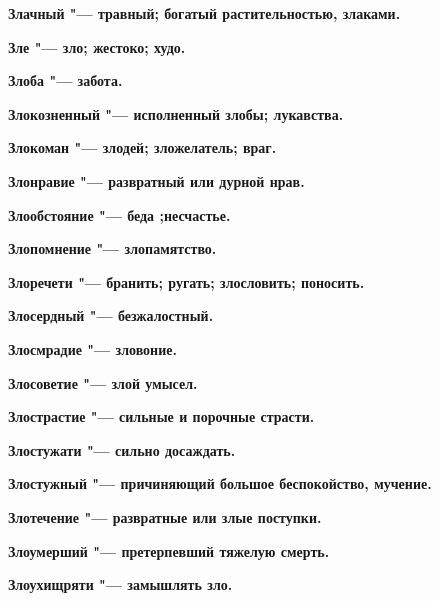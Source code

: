 \begin{mymulticols}{2}
\bfseries Злачный\normalfont{} "--- травный; богатый растительностью, злаками. 




\bfseries Зле\normalfont{} "--- зло; жестоко; худо. 




\bfseries Злоба\normalfont{} "--- забота. 




\bfseries Злокозненный\normalfont{} "--- исполненный злобы; лукавства. 




\bfseries Злокоман\normalfont{} "--- злодей; зложелатель; враг. 




\bfseries Злонравие\normalfont{} "--- развратный или дурной нрав. 




\bfseries Злообстояние\normalfont{} "--- беда ;несчастье. 




\bfseries Злопомнение\normalfont{} "--- злопамятство. 




\bfseries Злоречети\normalfont{} "--- бранить; ругать; злословить; поносить. 




\bfseries Злосердный\normalfont{} "--- безжалостный. 




\bfseries Злосмрадие\normalfont{} "--- зловоние. 




\bfseries Злосоветие\normalfont{} "--- злой умысел. 




\bfseries Злострастие\normalfont{} "--- сильные и порочные страсти. 




\bfseries Злостужати\normalfont{} "--- сильно досаждать. 




\bfseries Злостужный\normalfont{} "--- причиняющий большое беспокойство, мучение. 




\bfseries Злотечение\normalfont{} "--- развратные или злые поступки. 




\bfseries Злоумерший\normalfont{} "--- претерпевший тяжелую смерть. 




\bfseries Злоухищряти\normalfont{} "--- замышлять зло. 





\end{mymulticols}
